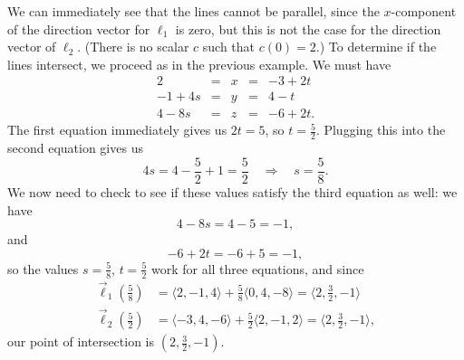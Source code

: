 
{We can immediately see that the lines cannot be parallel, since the $x$-component of the direction vector for $\ell_1$ is zero, but this is not the case for the direction vector of $\ell_2$. (There is no scalar $c$ such that $c(0)=2$.) To determine if the lines intersect, we proceed as in the previous example. We must have
\[
\begin{array}{ccccc}
2 & = & x & = &-3+2t\\
-1+4s & = &  y & = & 4-t\\
4-8s & = & z & = & -6+2t.
\end{array}
\]
The first equation immediately gives us $2t=5$, so $t=\frac{5}{2}$. Plugging this into the second equation gives us
\[
4s = 4-\frac{5}{2}+1 = \frac{5}{2} \quad \Rightarrow \quad s=\frac{5}{8}.
\]
We now need to check to see if these values satisfy the third equation as well: we have
\[
4-8s = 4-5=-1,
\]
and
\[
-6+2t = -6+5=-1,
\]
so the values $s=\frac{5}{8}$, $t=\frac{5}{2}$ work for all three equations, and since
\begin{align*}
\vec\ell_1\left(\frac{5}{8}\right) &= \langle 2, -1, 4\rangle +\frac{5}{8}\langle 0, 4, -8\rangle = \langle 2, \frac{3}{2}, -1\rangle \tag*{and}\\
\vec\ell_2\left(\frac{5}{2}\right) & = \langle -3, 4, -6\rangle+\frac{5}{2}\langle 2, -1, 2\rangle = \langle 2, \frac{3}{2}, -1\rangle,
\end{align*}
our point of intersection is $(2, \frac{3}{2}, -1)$.
}\\


